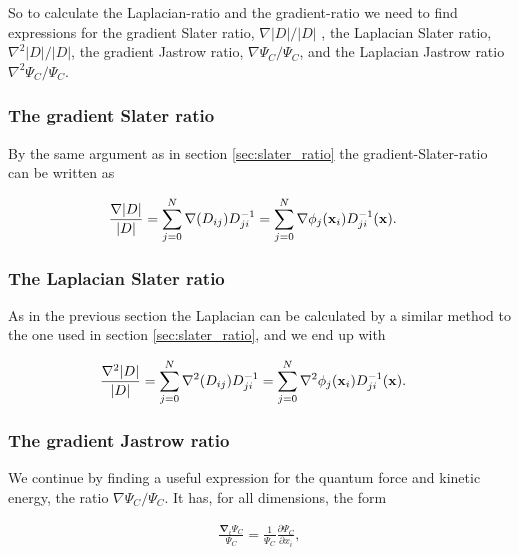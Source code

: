 			So to calculate the Laplacian-ratio and the gradient-ratio we need to find expressions for the gradient Slater ratio, \( \nabla|D|/|D| \) , the Laplacian Slater ratio, \(\nabla^2  |D|/|D| \), the gradient Jastrow ratio, \( \nabla\Psi_C/\Psi_C \), and the Laplacian Jastrow ratio \( \nabla^2\Psi_C/\Psi_C \).


		\subsubsection{The gradient Slater ratio}

			By the same argument as in section \ref{sec:slater_ratio} the gradient-Slater-ratio can be written as

			\begin{align}
				\frac{\nabla |D|}{|D|} &= \sum_{j = 0}^{N}\nabla (D_{ij})D_{ji}^{-1} = \sum_{j = 0}^{N} \nabla \phi_j(\vb{x}_i) D_{ji}^{-1}(\vb{x}).
			\end{align}

		\subsubsection{The Laplacian Slater ratio}

			As in the previous section the Laplacian can be calculated by a similar method to the one used in section \ref{sec:slater_ratio}, and we end up with

			\begin{align}
				\frac{\nabla^2 |D|}{|D|} &= \sum_{j = 0}^{N}\nabla^2 (D_{ij})D_{ji}^{-1} = \sum_{j = 0}^{N} \nabla^2 \phi_j(\vb{x}_i) D_{ji}^{-1}(\vb{x}).
			\end{align}

		\subsubsection{The gradient Jastrow ratio}
			We continue by finding a useful expression for the quantum force and kinetic energy, the ratio $\nabla\Psi_{C}/\Psi_{C}$. It has,
			for all dimensions, the form

			\begin{align}
				\frac{\mathbf{\nabla}_{i}\Psi_{C}}{\Psi_{C}}=\frac{1}{\Psi_{C}}\frac{\partial\Psi_{C}}{\partial x_{i}},
			\end{align}

